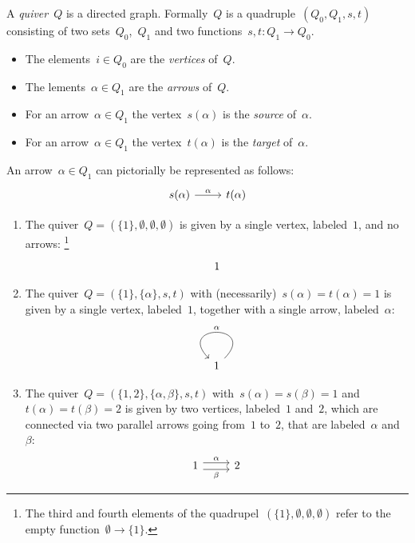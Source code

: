 \begin{definition}
  A \emph{quiver}~$Q$ is a directed graph.
  Formally~$Q$ is a quadruple~$(Q_0, Q_1, s, t)$ consisting of two sets~$Q_0$,~$Q_1$ and two functions~$s, t \colon Q_1 \to Q_0$.
  \begin{itemize}
    \item
      The elements~$i \in Q_0$ are the \emph{vertices} of~$Q$.
    \item
      The lements~$\alpha \in Q_1$ are the \emph{arrows} of~$Q$.
    \item
      For an arrow~$\alpha \in Q_1$ the vertex~$s(\alpha)$ is the \emph{source} of~$\alpha$.
    \item
      For an arrow~$\alpha \in Q_1$ the vertex~$t(\alpha)$ is the \emph{target} of~$\alpha$.
  \end{itemize}
  An arrow~$\alpha \in Q_1$ can pictorially be represented as follows:
  \[
    \begin{tikzcd}
        s(\alpha)
        \arrow{r}[above]{\alpha}
      & t(\alpha)
    \end{tikzcd}
  \]
\end{definition}


\begin{example}
  \label{quivers first examples}
  \leavevmode
  \begin{enumerate}
    \item
      The quiver~$Q = (\{1\}, \emptyset, \emptyset, \emptyset)$ is given by a single vertex, labeled~$1$, and no arrows:%
      \footnote{The third and fourth elements of the quadrupel~$(\{1\}, \emptyset, \emptyset, \emptyset)$ refer to the empty function~$\emptyset \to \{1\}$.}
      \[
        \begin{tikzcd}
          1
        \end{tikzcd}
      \]
    \item
      The quiver~$Q = (\{1\}, \{\alpha\}, s, t)$ with (necessarily)~$s(\alpha) = t(\alpha) = 1$ is given by a single vertex, labeled~$1$, together with a single arrow, labeled~$\alpha$:
      \[
        \begin{tikzcd}
          1
          \arrow[loop]{r}[above]{\alpha}
        \end{tikzcd}
      \]
    \item
      The quiver~$Q = (\{1, 2\}, \{\alpha, \beta\}, s, t)$ with~$s(\alpha) = s(\beta) = 1$ and~$t(\alpha) = t(\beta) = 2$ is given by two vertices, labeled~$1$ and~$2$, which are connected via two parallel arrows going from~$1$ to~$2$, that are labeled~$\alpha$ and~$\beta$:
      \[
        \begin{tikzcd}
            1
            \arrow[shift left = 0.3em]{r}[above]{\alpha}
            \arrow[shift right = 0.3em]{r}[below]{\beta}
          & 2
        \end{tikzcd}
      \]
  \end{enumerate}
\end{example}


